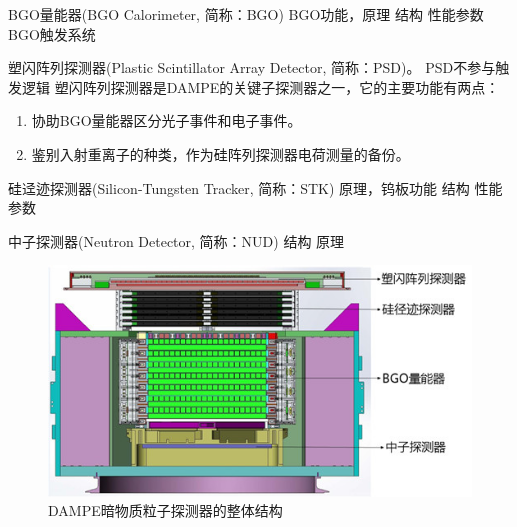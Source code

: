 BGO量能器(BGO Calorimeter, 简称：BGO)
BGO功能，原理
结构
性能参数
BGO触发系统

塑闪阵列探测器(Plastic Scintillator Array Detector, 简称：PSD)。
PSD不参与触发逻辑
塑闪阵列探测器是DAMPE的关键子探测器之一，它的主要功能有两点：
\begin{enumerate}
	\item 协助BGO量能器区分光子事件和电子事件。
	\item 鉴别入射重离子的种类，作为硅阵列探测器电荷测量的备份。
\end{enumerate}

硅迳迹探测器(Silicon-Tungsten Tracker, 简称：STK)
原理，钨板功能
结构
性能参数

中子探测器(Neutron Detector, 简称：NUD)
结构
原理

\begin{figure}
\centering
\includegraphics[width=0.8\linewidth]{chap/introduction/fig/dampe_structure_2}
\caption{DAMPE暗物质粒子探测器的整体结构}
\label{fig:dampe_structure}
\end{figure}
